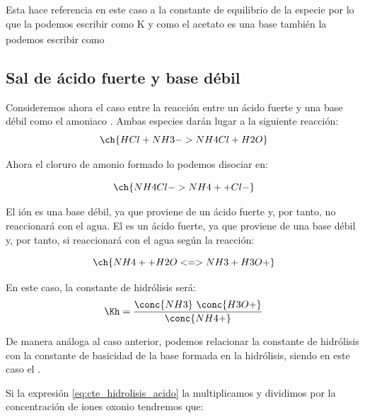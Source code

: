     Esta \Kh hace referencia en este caso a la constante de equilibrio de la especie  por lo que la podemos escribir como K\textsubscript{} y como el acetato es una base también la podemos escribir como \Kb

    \subsection{Sal de ácido fuerte y base débil}\label{subsec:sal-de-acido-fuerte-y-base-debil}

    Consideremos ahora el caso entre la reacción entre un ácido fuerte  y una base débil como el amoniaco .
    Ambas especies darán lugar a la siguiente reacción:
    \begin{equation*}
        \ch{HCl + NH3 -> NH4Cl + H2O}
    \end{equation*}

    Ahora el cloruro de amonio formado lo podemos disociar en:

    \begin{equation*}
        \ch{NH4Cl -> NH4+ + Cl-}
    \end{equation*}

    El ión  es una base débil, ya que proviene de un ácido fuerte y, por tanto, no reaccionará con el agua.
    El  es un ácido fuerte, ya que proviene de una base débil y, por tanto, si reaccionará con el agua según la reacción:

    \begin{equation*}
        \ch{NH4+ + H2O  <=> NH3 + H3O+}
    \end{equation*}

    En este caso, la constante de hidrólisis será:
    \begin{equation}
        \Kh = \dfrac{\conc{NH3}\ \conc{H3O+}}{\conc{NH4+}} \label{eq:cte_hidrolisis_acido}
    \end{equation}



    De manera análoga al caso anterior, podemos relacionar la constante de hidrólisis con la constante de basicidad de la base formada en la hidrólisis, siendo en este caso el .

    Si la expresión \eqref{eq:cte_hidrolisis_acido} la multiplicamos y dividimos por la concentración de iones oxonio  tendremos que:

